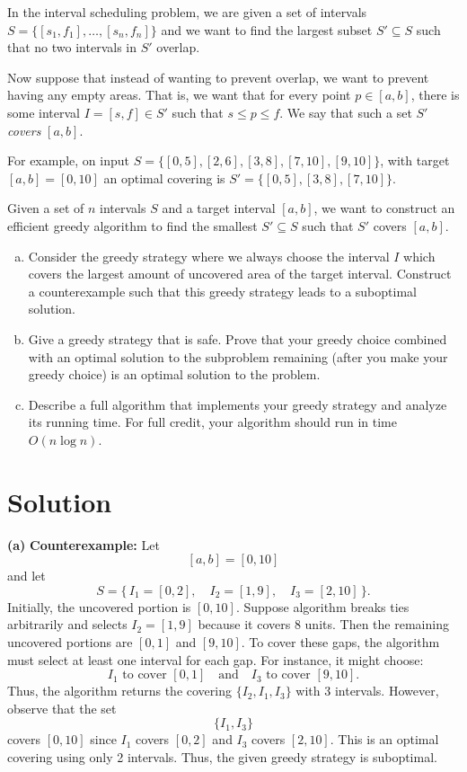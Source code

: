 \documentclass[11pt]{article}
\begin{document}
    \begin{tcolorbox}[title={Problem 2 (Min Interval Scheduling, 35 pts)}] \setlength\parindent{1em}
        In the interval scheduling problem, we are given a set of intervals $S=\{[s_1, f_1],\dots,[s_n,f_n]\}$ and we want to find the largest subset $S'\subseteq S$ such that no two intervals in $S'$ overlap. 

        Now suppose that instead of wanting to prevent overlap, we want to prevent having any empty areas. That is, we want that for every point $p \in [a, b]$, there is some interval $I = [s,f] \in S'$ such that $s \leq p \leq f$. We say that such a set $S'$ \emph{covers} $[a,b]$.
        
        For example, on input $S = \{[0,5], [2,6], [3, 8], [7, 10], [9, 10]\}$, with target $[a,b] = [0, 10]$ an optimal covering is $S' = \{[0,5], [3,8], [7, 10]\}$.
        
        Given a set of $n$ intervals $S$ and a target interval $[a,b]$, we want to construct an efficient greedy algorithm to find the smallest $S' \subseteq S$ such that $S'$ covers $[a,b]$.
        
        \begin{enumerate}[(a)]
            \item Consider the greedy strategy where we always choose the interval $I$ which covers the largest amount of uncovered area of the target interval. Construct a counterexample such that this greedy strategy leads to a suboptimal solution.
            \item Give a greedy strategy that is safe. Prove that your greedy choice combined with an optimal solution to the subproblem remaining (after you make your greedy choice) is an optimal solution to the problem.
            \item Describe a full algorithm that implements your greedy strategy and analyze its running time. For full credit, your algorithm should run in time $O(n\log n)$.
        \end{enumerate}
    \end{tcolorbox}
    \section*{Solution}
    \noindent\textbf{(a)} 
    \medskip
    \noindent \textbf{Counterexample:} Let 
    \[
    [a,b] = [0,10]
    \]
    and let 
    \[
    S = \{\, I_1 = [0,2],\quad I_2 = [1,9],\quad I_3 = [2,10] \,\}.
    \]
    Initially, the uncovered portion is \([0,10]\). Suppose algorithm breaks ties arbitrarily and selects \(I_2 = [1,9]\) because it covers 8 units. Then the remaining uncovered portions are \([0,1]\) and \([9,10]\). To cover these gaps, the algorithm must select at least one interval for each gap. For instance, it might choose:
    \[
    I_1 \text{ to cover } [0,1] \quad \text{and} \quad I_3 \text{ to cover } [9,10].
    \]
    Thus, the algorithm returns the covering \(\{I_2, I_1, I_3\}\) with 3 intervals. However, observe that the set 
    \[
    \{I_1, I_3\}
    \]
    covers \([0,10]\) since \(I_1\) covers \([0,2]\) and \(I_3\) covers \([2,10]\). This is an optimal covering using only 2 intervals. Thus, the given greedy strategy is suboptimal.
    
\end{document}
